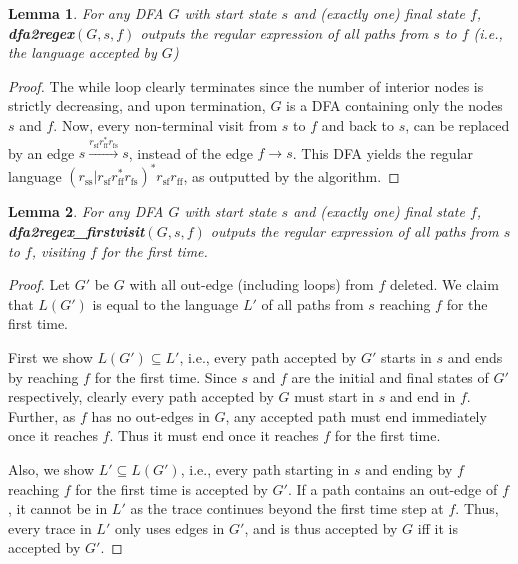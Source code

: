 \documentclass[preprint,12pt]{elsarticle}
\newtheorem{lemma}{Lemma}[section]
\theoremstyle{definition}
\theoremstyle{remark}
\begin{document}
\begin{lemma}
    For any DFA $G$ with start state $s$ and (exactly one) final state $f$, \textbf{dfa2regex}$(G, s, f)$ outputs the regular expression of all paths from $s$ to $f$ (i.e., the language accepted by $G$)
\end{lemma}
\begin{proof}
    The while loop clearly terminates since the number of interior nodes is strictly decreasing, and upon termination, $G$ is a DFA containing only the nodes $s$ and $f$. Now, every non-terminal visit from $s$ to $f$ and back to $s$, can be replaced by an edge $s\xrightarrow{r_\mathrm{sf}r_\mathrm{ff}^* r_\mathrm{fs}} s$, instead of the edge $f\to s$. This DFA yields the regular language $(r_\mathrm{ss}|r_\mathrm{sf}r_\mathrm{ff}^* r_\mathrm{fs})^* r_\mathrm{sf} r_\mathrm{ff}$, as outputted by the algorithm.
\end{proof}

\begin{lemma}
    For any DFA $G$ with start state $s$ and (exactly one) final state $f$, \textbf{dfa2regex\_firstvisit}$(G, s, f)$ outputs the regular expression of all paths from $s$ to $f$, visiting $f$ for the first time.
\end{lemma}
\begin{proof}
    Let $G'$ be $G$ with all out-edge (including loops) from $f$ deleted. We claim that $L(G')$ is equal to the language $L'$ of all paths from $s$ reaching $f$ for the first time.

    First we show $L(G') \subseteq L'$, i.e., every path accepted by $G'$ starts in $s$ and ends by reaching $f$ for the first time. Since $s$ and $f$ are the initial and final states of $G'$ respectively, clearly every path accepted by $G$ must start in $s$ and end in $f$. Further, as $f$ has no out-edges in $G$, any accepted path must end immediately once it reaches $f$. Thus it must end once it reaches $f$ for the first time.

    Also, we show $L' \subseteq L(G')$, i.e., every path starting in $s$ and ending by $f$ reaching $f$ for the first time is accepted by $G'$. If a path contains an out-edge of $f$, it cannot be in $L'$ as the trace continues beyond the first time step at $f$. Thus, every trace in $L'$ only uses edges in $G'$, and is thus accepted by $G$ iff it is accepted by $G'$.
\end{proof}
\end{document}
